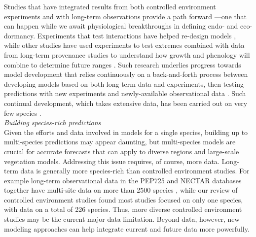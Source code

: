 \documentclass[11pt,letter]{article}
\begin{document}
Studies that have integrated results from both controlled environment experiments and with long-term observations provide a path forward \citep{Caffarra:2011qf,nagano2012,satake2013,ford2016,chuinearees}---one that can happen while we await physiological breakthroughs in defining endo- and eco-dormancy. Experiments that test interactions have helped re-design models \citep{Caffarra:2011qf,chuinearees}, while other studies have used experiments to test extremes combined with data from long-term provenance studies to understand how growth and phenology will combine to determine future ranges \citep{ford2016}. Such research underlies progress towards model development that relies continuously on a back-and-forth process between developing models based on both long-term data and experiments, then testing predictions with new experiments and newly-available observational data \citep[i.e., more years and also data from new locations,][]{nagano2012,satake2013}. Such continual development, which takes extensive data, has been carried out on very few species \citep[e.g., \emph{Arabidopsis thaliana}, \emph{Oryza sativa} (rice), \emph{Arabidopsis halleri},][]{Wilczek:2009oa,nagano2012,satake2013}.\\

\emph{Building species-rich predictions}\\
Given the efforts and data involved in models for a single species, building up to multi-species predictions may appear daunting, but multi-species models are crucial for accurate forecasts that can apply to diverse regions and large-scale vegetation models. Addressing this issue requires, of course, more data. Long-term data is generally more species-rich than controlled environment studies. For example long-term observational data in the PEP725 and NECTAR databases together have multi-site data on more than 2500 species \citep{nectar,Templ2018}, while our review of controlled environment studies found most studies focused on only one species, with data on a total of 226 species. Thus, more diverse controlled environment studies may be the current major data limitation. Beyond data, however, new modeling approaches can help integrate current and future data more powerfully. \\
\end{document}

